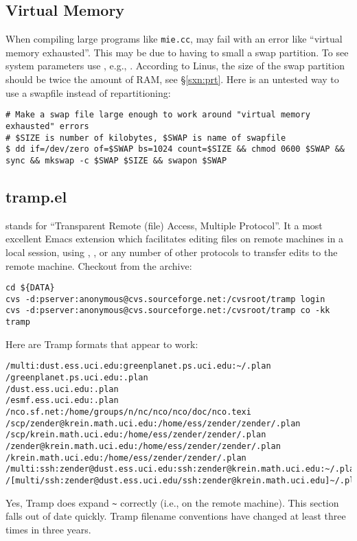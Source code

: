 \documentclass[12pt,twoside]{article}
\begin{document}
\subsection{Virtual Memory}\label{sxn:mem}
When compiling large programs like \verb'mie.cc',  may fail
with an error like ``virtual memory exhausted''.
This may be due to having to small a swap partition.
To see system parameters use , e.g., .
According to Linus, the size of the swap partition should be twice the
amount of RAM, see \S\ref{sxn:prt}. 
Here is an untested way to use a swapfile instead of repartitioning:
\begin{verbatim}
# Make a swap file large enough to work around "virtual memory exhausted" errors
# $SIZE is number of kilobytes, $SWAP is name of swapfile
$ dd if=/dev/zero of=$SWAP bs=1024 count=$SIZE && chmod 0600 $SWAP && sync && mkswap -c $SWAP $SIZE && swapon $SWAP 
\end{verbatim}

\subsection{tramp.el}\label{sxn:tramp}
 stands for ``Transparent Remote (file) Access, Multiple
Protocol''.
It a most excellent Emacs extension which facilitates editing
files on remote machines in a local  session, using
, , or any number of other protocols to 
transfer edits to the remote machine.
Checkout  from the  archive:
\begin{verbatim}
cd ${DATA}
cvs -d:pserver:anonymous@cvs.sourceforge.net:/cvsroot/tramp login
cvs -d:pserver:anonymous@cvs.sourceforge.net:/cvsroot/tramp co -kk tramp
\end{verbatim}
Here are Tramp formats that appear to work:
\begin{verbatim}
/multi:dust.ess.uci.edu:greenplanet.ps.uci.edu:~/.plan
/greenplanet.ps.uci.edu:.plan
/dust.ess.uci.edu:.plan
/esmf.ess.uci.edu:.plan
/nco.sf.net:/home/groups/n/nc/nco/nco/doc/nco.texi
/scp/zender@krein.math.uci.edu:/home/ess/zender/zender/.plan
/scp/krein.math.uci.edu:/home/ess/zender/zender/.plan
/zender@krein.math.uci.edu:/home/ess/zender/zender/.plan
/krein.math.uci.edu:/home/ess/zender/zender/.plan
/multi:ssh:zender@dust.ess.uci.edu:ssh:zender@krein.math.uci.edu:~/.plan
/[multi/ssh:zender@dust.ess.uci.edu/ssh:zender@krein.math.uci.edu]~/.plan
\end{verbatim}
Yes, Tramp does expand \verb'~' correctly (i.e., on the remote machine).
This section falls out of date quickly.
Tramp filename conventions have changed at least three times in three
years. 
\end{document}
